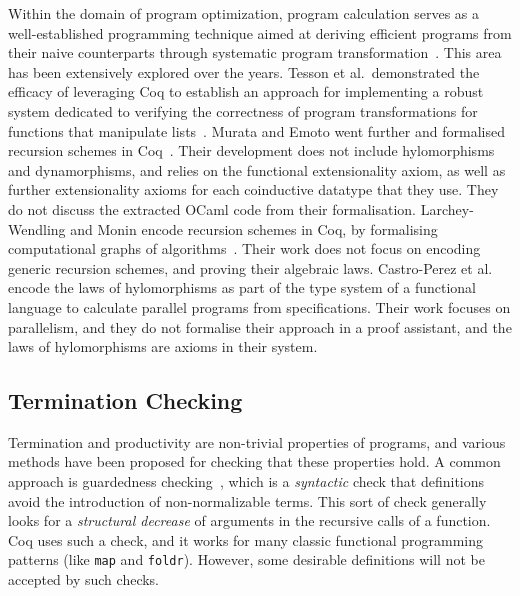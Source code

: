 \documentclass[ a4paper, UKenglish, cleveref, autoref, thm-restate]{lipics-v2021}
\newcommand{\mvol}[1]{\textcolor{blue}{\textsc{Michael}: #1}}
\newcommand{\haskell}[1]{\texttt{#1}}
\begin{document}
Within the domain of program optimization, program calculation serves as a
well-established programming technique aimed at deriving efficient programs
from their naive counterparts through systematic program
transformation~\cite{gibbonsSquiggol}. This area has been extensively explored
over the years. Tesson et al.\ demonstrated the efficacy of leveraging Coq to
establish an approach for implementing a robust system dedicated to verifying
the correctness of program transformations for functions that manipulate
lists~\cite{10.1007/978-3-642-17796-5_10}. Murata and Emoto went further and
formalised recursion schemes in Coq~\cite{MurataE19}. Their development does
not include hylomorphisms and dynamorphisms, and relies on the functional
extensionality axiom, as well as further extensionality axioms for each
coinductive datatype that they use. They do not discuss the extracted OCaml
code from their formalisation.  Larchey-Wendling and Monin encode recursion
schemes in Coq, by formalising computational graphs of
algorithms~\cite{larchey2022braga}. Their work does not focus on encoding
generic recursion schemes, and proving their algebraic laws.  Castro-Perez et
al.~\cite{farmsCastro} encode the laws of hylomorphisms as part of the type
system of a functional language to calculate parallel programs from
specifications. Their work focuses on parallelism, and they do not formalise
their approach in a proof assistant, and the laws of hylomorphisms are axioms
in their system.


\subsection{Termination Checking}\label{sec:termcheck}

Termination and productivity are non-trivial properties of programs, and various
methods have been proposed for checking that these properties hold. A common
approach is guardedness checking~\cite{Eduardo94}, which is a
\emph{syntactic} check that definitions avoid the introduction of
non-normalizable terms. This sort of check generally looks for a
\emph{structural decrease} of arguments in the recursive calls of a function.
Coq uses such a check, and it works for many classic functional programming
patterns (like \haskell{map} and \haskell{foldr}). However, some desirable
definitions will not be accepted by such checks.
\end{document}
